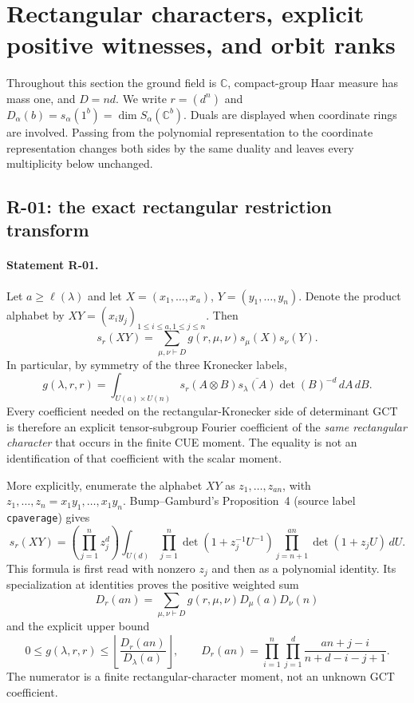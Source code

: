 \documentclass[11pt,a4paper]{article}
\theoremstyle{definition}\newtheorem{definition}{Definition}
\begin{document}
\section{Rectangular characters, explicit positive witnesses, and orbit ranks}

Throughout this section the ground field is $\mathbb C$, compact-group Haar
measure has mass one, and $D=nd$. We write $r=(d^n)$ and
$D_\alpha(b)=s_\alpha(1^b)=\dim S_\alpha(\mathbb C^b)$.
Duals are displayed when coordinate rings are involved. Passing from the
polynomial representation to the coordinate representation changes both sides
by the same duality and leaves every multiplicity below unchanged.

\subsection{R-01: the exact rectangular restriction transform}

\paragraph{Statement R-01.}
Let $a\geq\ell(\lambda)$ and let $X=(x_1,\ldots,x_a)$,
$Y=(y_1,\ldots,y_n)$. Denote the product alphabet by
$XY=(x_i y_j)_{1\leq i\leq a,1\leq j\leq n}$. Then
\begin{equation}\label{R01:branching}
 s_r(XY)=\sum_{\mu,\nu\vdash D}
 g(r,\mu,\nu)s_\mu(X)s_\nu(Y).
\end{equation}
In particular, by symmetry of the three Kronecker labels,
\begin{equation}\label{R01:haar}
 g(\lambda,r,r)=\int_{U(a)\times U(n)}
 s_r(A\otimes B)\overline{s_\lambda(A)}\det(B)^{-d}\,dA\,dB.
\end{equation}
Every coefficient needed on the rectangular-Kronecker side of determinant
GCT is therefore an explicit tensor-subgroup Fourier coefficient of the
\emph{same rectangular character} that occurs in the finite CUE moment.
The equality is not an identification of that coefficient with the scalar
moment.

More explicitly, enumerate the alphabet $XY$ as $z_1,\ldots,z_{an}$, with
$z_1,\ldots,z_n=x_1y_1,\ldots,x_1y_n$. Bump--Gamburd's Proposition~4
(source label \texttt{cpaverage}) gives
\begin{equation}\label{R01:CUE}
 s_r(XY)=\left(\prod_{j=1}^n z_j^d\right)
 \int_{U(d)}\prod_{j=1}^n\det(1+z_j^{-1}U^{-1})
 \prod_{j=n+1}^{an}\det(1+z_jU)\,dU.
\end{equation}
This formula is first read with nonzero $z_j$ and then as a polynomial identity.
Its specialization at identities proves the positive weighted sum
\begin{equation}\label{R01:dimension}
 D_r(an)=\sum_{\mu,\nu\vdash D}
 g(r,\mu,\nu)D_\mu(a)D_\nu(n)
\end{equation}
and the explicit upper bound
\begin{equation}\label{R01:bound}
 0\leq g(\lambda,r,r)\leq
 \left\lfloor\frac{D_r(an)}{D_\lambda(a)}\right\rfloor,
 \qquad
 D_r(an)=\prod_{i=1}^{n}\prod_{j=1}^{d}
 \frac{an+j-i}{n+d-i-j+1}.
\end{equation}
The numerator is a finite rectangular-character moment, not an unknown GCT
coefficient.
\end{document}
